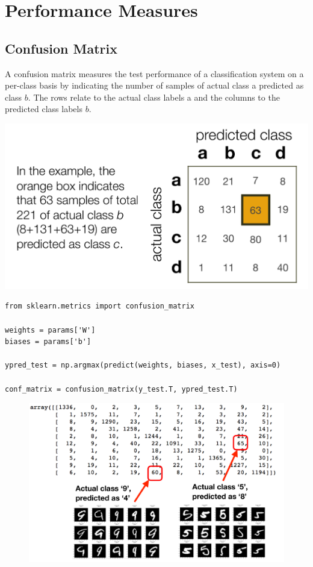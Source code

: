 \documentclass[11pt]{article}
\begin{document}
\section{Performance Measures}

\subsection{Confusion Matrix}

\begin{minipage}{0.5\textwidth}
	A confusion matrix measures the test performance of a classification system on a per-class basis by indicating the number of samples of actual class a predicted as class $b$. The rows relate to the actual class labels a and the columns to the predicted class labels $b$.
\end{minipage}
\begin{minipage}{0.5\textwidth}
	\centering
	\includegraphics[width=\linewidth,keepaspectratio]{confusion_matrix}
\end{minipage}

\begin{verbatim}
from sklearn.metrics import confusion_matrix

weights = params['W']
biases = params['b']

ypred_test = np.argmax(predict(weights, biases, x_test), axis=0)

conf_matrix = confusion_matrix(y_test.T, ypred_test.T)
\end{verbatim}

\begin{figure}[H]
	\centering
	\includegraphics[width=0.8\linewidth,keepaspectratio]{confusion_matrix_output}
\end{figure}
\end{document}
